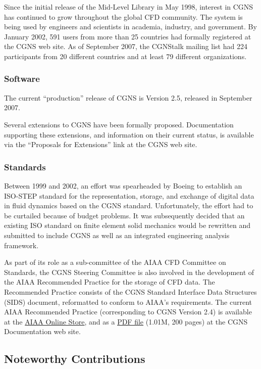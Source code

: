 Since the initial release of the Mid-Level Library in May 1998,
interest in CGNS has continued to grow throughout the global CFD
community.
The system is being used by engineers and scientists in academia,
industry, and government.
By January 2002, 591 users from more than 25 countries had formally
registered at the CGNS web site.
As of September 2007, the CGNStalk mailing list had 224 participants
from 20 different countries and at least 79 different organizations.

\subsubsection{Software}

The current ``production'' release of CGNS is Version 2.5, released in
September 2007.

Several extensions to CGNS have been formally proposed.
Documentation supporting these extensions, and information on their
current status, is available via the ``Proposals for Extensions'' link at
the CGNS web site.

\subsubsection{Standards}

Between 1999 and 2002, an effort was spearheaded by Boeing to establish
an ISO-STEP standard for the representation, storage, and exchange of
digital data in fluid dynamics based on the CGNS standard.
Unfortunately, the effort had to be curtailed because of budget
problems.
It was subsequently decided that an existing ISO standard on finite
element solid mechanics would be rewritten and submitted to include CGNS
as well as an integrated engineering analysis framework.

As part of its role as a sub-committee of the AIAA CFD Committee
on Standards, the CGNS Steering Committee is also involved in the
development of the AIAA Recommended Practice for the storage of CFD
data.
The Recommended Practice consists of the CGNS Standard Interface
Data Structures (SIDS) document, reformatted to conform to AIAA's
requirements.
The current AIAA Recommended Practice (corresponding to CGNS Version
2.4) is available at the
\href{http://www.aiaa.org/content.cfm?pageid=363&id=1657}{AIAA
Online Store}, and as a
\href{http://www.grc.nasa.gov/www/cgns/sids/aiaa/R_101A_2005.pdf}{PDF file}
(1.01M, 200 pages) at the CGNS Documentation web site.

\subsection{Noteworthy Contributions}

